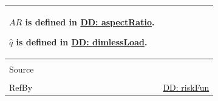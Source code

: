 \documentclass[12pt]{article}
\begin{document}
\begin{minipage}{\textwidth}
\begin{tabular}{>{\raggedright}p{}>{\raggedright\arraybackslash}p{}}
        $AR$ is defined in \hyperref[DD:aspectRatio]{DD: aspectRatio}.
        
        $\hat{q}$ is defined in \hyperref[DD:dimlessLoad]{DD: dimlessLoad}.
        
\\ \midrule \\
Source & \cite{astm2009}
         
\\ \midrule \\
RefBy & \hyperref[DD:riskFun]{DD: riskFun}
        
\\ \bottomrule
\end{tabular}
\end{minipage}

\vspace{\baselineskip}
\noindent
\end{document}
